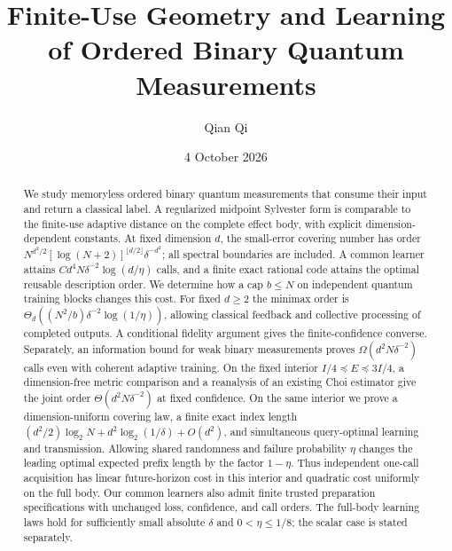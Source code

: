 \documentclass[11pt]{amsart}
\title[Finite-use measurement geometry and learning]{Finite-Use Geometry and Learning of Ordered Binary Quantum Measurements}
\author{Qian Qi}
\date{4 October 2026}
\numberwithin{equation}{section}
\theoremstyle{definition}\newtheorem{definition}[theorem]{Definition}
\theoremstyle{remark}\newtheorem{remark}[theorem]{Remark}
\begin{document}
\raggedbottom
\begin{abstract}
We study memoryless ordered binary quantum measurements that consume
their input and return a classical label.  A regularized midpoint
Sylvester form is comparable to the finite-use adaptive distance on
the complete effect body, with explicit dimension-dependent constants.
At fixed dimension $d$, the small-error covering number has order
\mbox{$N^{d^2/2}[\log(N+2)]^{\lfloor d/2\rfloor}\delta^{-d^2}$};
all spectral boundaries are included.  A common learner attains
$Cd^4N\delta^{-2}\log(d/\eta)$ calls, and a finite exact rational
code attains the optimal reusable description order.
We determine how a cap $b\le N$ on independent quantum training
blocks changes this cost.  For fixed $d\ge2$ the minimax order is
$\Theta_d((N^2/b)\delta^{-2}\log(1/\eta))$, allowing classical
feedback and collective processing of completed outputs.
A conditional fidelity argument gives the finite-confidence converse.
Separately, an information bound for weak binary measurements proves
$\Omega(d^2N\delta^{-2})$ calls even with coherent adaptive training.
On the fixed interior $I/4\preceq E\preceq3I/4$, a dimension-free
metric comparison and a reanalysis of an existing Choi estimator give
the joint order $\Theta(d^2N\delta^{-2})$ at fixed confidence.
On the same interior we prove a dimension-uniform covering law,
a finite exact index length
$(d^2/2)\log_2N+d^2\log_2(1/\delta)+O(d^2)$,
and simultaneous query-optimal learning and transmission.
Allowing shared randomness and failure probability $\eta$ changes
the leading optimal expected prefix length by the factor $1-\eta$.
Thus independent one-call acquisition has linear future-horizon cost
in this interior and quadratic cost uniformly on the full body.
Our common learners also admit finite trusted preparation specifications
with unchanged loss, confidence, and call orders.
The full-body learning laws hold for sufficiently small absolute
$\delta$ and $0<\eta\le1/8$; the scalar case is stated separately.
\end{abstract}
\maketitle














\appendix


\end{document}
